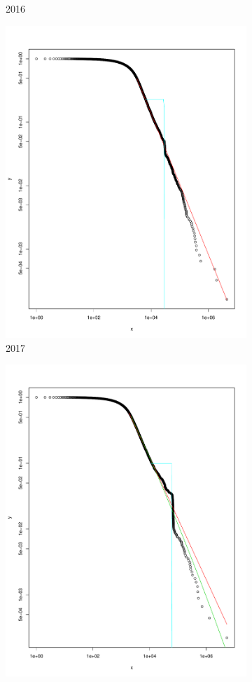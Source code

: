 \documentclass[preprint,12pt]{elsarticle}
\begin{document}
\begin{figure}[H]
\begin{subfigure}{.3\textwidth}
  \caption{2016}
  \label{fig:2016in}
\end{subfigure}
\begin{subfigure}{.3\textwidth}
  \centering
  \includegraphics[width=.8\linewidth]{Bitcoin-graphs/deg-dist-2017-in.pdf}  
  \caption{2017}
  \label{fig:2017in}
\end{subfigure}
\begin{subfigure}{.3\textwidth}
  \centering
  \includegraphics[width=.8\linewidth]{Bitcoin-graphs/deg-dist-in-2018.pdf}  

\end{subfigure}
\end{figure}
\end{document}
